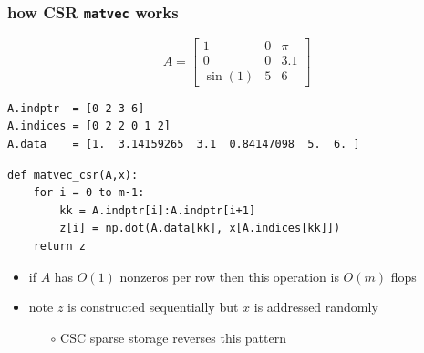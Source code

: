\documentclass[10pt,
               svgnames,
               hyperref={colorlinks,citecolor=DeepPink4,linkcolor=FireBrick,urlcolor=Maroon},
               usepdftitle=false]{beamer}
\begin{document}
\begin{frame}[fragile]
\frametitle{how CSR \texttt{matvec} works}

$$A = \begin{bmatrix} 1 & 0 & \pi \\ 0 & 0 & 3.1 \\ \sin(1) & 5 & 6 \end{bmatrix}$$

\bigskip
\begin{verbatim}
A.indptr  = [0 2 3 6]
A.indices = [0 2 2 0 1 2]
A.data    = [1.  3.14159265  3.1  0.84147098  5.  6. ]
\end{verbatim}

\bigskip
\begin{center}
\begin{minipage}{0.7\textwidth}
\begin{verbatim}
def matvec_csr(A,x):
    for i = 0 to m-1:
        kk = A.indptr[i]:A.indptr[i+1]
        z[i] = np.dot(A.data[kk], x[A.indices[kk]])
    return z
\end{verbatim}
\end{minipage}
\end{center}

\begin{itemize}
\item if $A$ has $O(1)$ nonzeros per row then this operation is $O(m)$ flops
\item note $z$ is constructed sequentially but $x$ is addressed randomly
   \begin{itemize}
   \item[$\circ$] CSC sparse storage reverses this pattern
   \end{itemize}
\end{itemize}
\end{frame}


%
%
%
\end{document}
